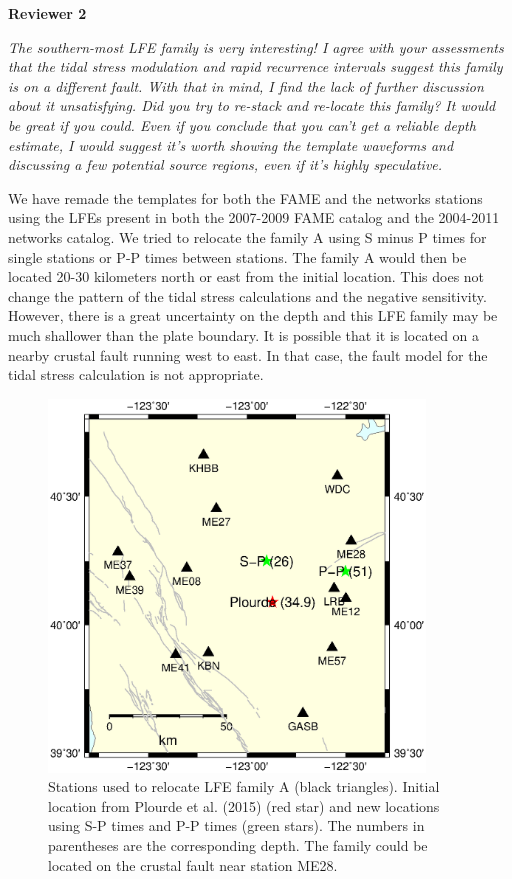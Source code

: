 \documentclass[letterpaper, 12pt]{article}
\begin{document}
\bigskip

\textbf{Reviewer 2}

\bigskip

\textit{The southern-most LFE family is very interesting! I agree with your assessments that the tidal stress modulation and rapid recurrence intervals suggest this family is on a different fault. With that in mind, I find the lack of further discussion about it unsatisfying. Did you try to re-stack and re-locate this family? It would be great if you could. Even if you conclude that you can't get a reliable depth estimate, I would suggest it's worth showing the template waveforms and discussing a few potential source regions, even if it's highly speculative.}

\bigskip

We have remade the templates for both the FAME and the networks stations using the LFEs present in both the 2007-2009 FAME catalog and the 2004-2011 networks catalog. We tried to relocate the family A using S minus P times for single stations or P-P times between stations. The family A would then be located 20-30 kilometers north or east from the initial location. This does not change the pattern of the tidal stress calculations and the negative sensitivity. However, there is a great uncertainty on the depth and this LFE family may be much shallower than the plate boundary. It is possible that it is located on a nearby crustal fault running west to east. In that case, the fault model for the tidal stress calculation is not appropriate.

\begin{figure}[hbt!]
\centering
\noindent\includegraphics[width=10cm, trim={1cm 11cm 6cm 4cm},clip]{figures/map_LFEs_answers.eps}
\caption{Stations used to relocate LFE family A (black triangles). Initial location from Plourde et al. (2015) (red star) and new locations using S-P times and P-P times (green stars). The numbers in parentheses are the corresponding depth. The family could be located on the crustal fault near station ME28.}
\end{figure}
\end{document}
